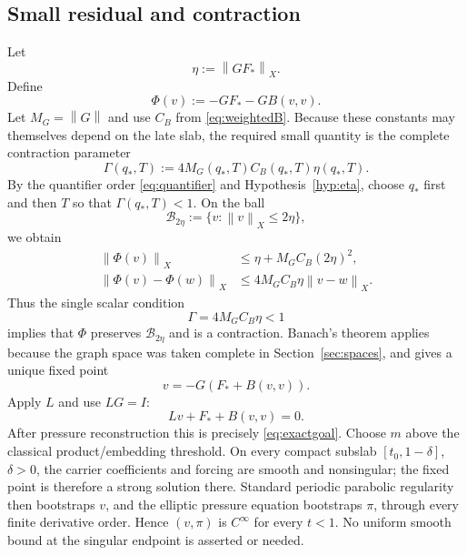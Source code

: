 \documentclass[11pt]{article}
\numberwithin{equation}{section}
\newcommand{\norm}[1]{\left\lVert #1\right\rVert}
\newcommand{\cB}{\mathcal B}
\begin{document}
\subsection{Small residual and contraction}
Let
\begin{equation}
\eta:=\norm{GF_*}_X.
\label{eq:eta}
\end{equation}
Define
\begin{equation}
\Phi(v):=-GF_*-GB(v,v).
\label{eq:Phi}
\end{equation}
Let \(M_G=\norm G\) and use \(C_B\) from \eqref{eq:weightedB}.  Because these constants may themselves depend on the late slab, the required small quantity is the complete contraction parameter
\begin{equation}
\Gamma(q_*,T):=4M_G(q_*,T)C_B(q_*,T)\eta(q_*,T).
\label{eq:Gamma}
\end{equation}
By the quantifier order \eqref{eq:quantifier} and Hypothesis~\ref{hyp:eta}, choose \(q_*\) first and then \(T\) so that \(\Gamma(q_*,T)<1\).  On the ball
\begin{equation}
\cB_{2\eta}:=\{v:\norm v_X\le2\eta\},
\label{eq:ball}
\end{equation}
we obtain
\begin{align}
\norm{\Phi(v)}_X
&\le\eta+M_GC_B(2\eta)^2,\label{eq:ballmap}\\
\norm{\Phi(v)-\Phi(w)}_X
&\le4M_GC_B\eta\norm{v-w}_X.\label{eq:contract}
\end{align}
Thus the single scalar condition
\begin{equation}
\boxed{\Gamma=4M_GC_B\eta<1}
\label{eq:smallcondition}
\end{equation}
implies that \(\Phi\) preserves \(\cB_{2\eta}\) and is a contraction.  Banach's theorem applies because the graph space was taken complete in Section~\ref{sec:spaces}, and gives a unique fixed point
\begin{equation}
v=-G(F_*+B(v,v)).
\label{eq:fixedpoint}
\end{equation}
Apply \(L\) and use \(LG=I\):
\begin{equation}
Lv+F_*+B(v,v)=0.
\label{eq:reszero}
\end{equation}
After pressure reconstruction this is precisely \eqref{eq:exactgoal}.  Choose \(m\) above the classical product/embedding threshold.  On every compact subslab \([t_0,1-\delta]\), \(\delta>0\), the carrier coefficients and forcing are smooth and nonsingular; the fixed point is therefore a strong solution there.  Standard periodic parabolic regularity then bootstraps \(v\), and the elliptic pressure equation bootstraps \(\pi\), through every finite derivative order.  Hence \((v,\pi)\) is \(C^\infty\) for every \(t<1\).  No uniform smooth bound at the singular endpoint is asserted or needed.
\end{document}
